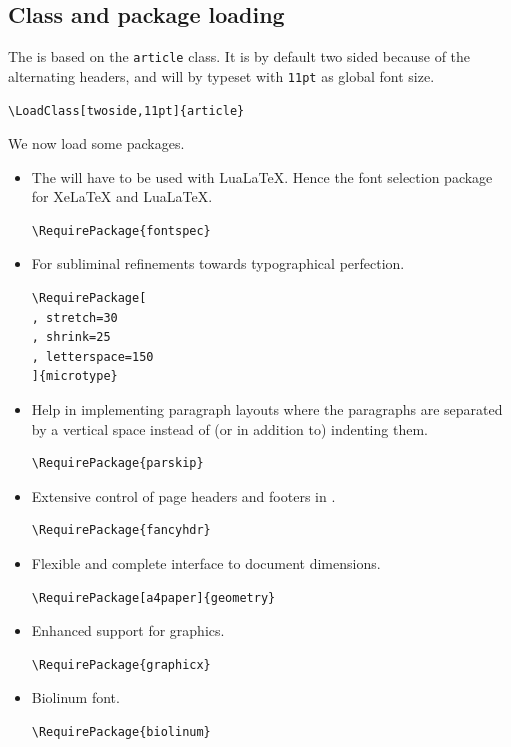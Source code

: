 \documentclass{letgut}
\begin{document}
\subsection{Class and package loading}
\label{sec:orgbefd239}

The  is based on the \lstinline+article+ class. It is by default two sided
because of the alternating headers, and will by typeset with \lstinline+11pt+ as global
font size.

\begin{lstlisting}
\LoadClass[twoside,11pt]{article}
\end{lstlisting}

We now load some packages.

\begin{itemize}
\item The  will have to be used with LuaLaTeX. Hence the font selection
package for XeLaTeX and LuaLaTeX.
\begin{lstlisting}
\RequirePackage{fontspec}
\end{lstlisting}
\item For subliminal refinements towards typographical perfection.
\begin{lstlisting}
\RequirePackage[
, stretch=30
, shrink=25
, letterspace=150
]{microtype}
\end{lstlisting}
\item Help in implementing paragraph layouts where the paragraphs are separated by
a vertical space instead of (or in addition to) indenting them.
\begin{lstlisting}
\RequirePackage{parskip}
\end{lstlisting}
\item Extensive control of page headers and footers in \LaTeXe.
\begin{lstlisting}
\RequirePackage{fancyhdr}
\end{lstlisting}
\item Flexible and complete interface to document dimensions.
\begin{lstlisting}
\RequirePackage[a4paper]{geometry}
\end{lstlisting}
\item Enhanced support for graphics.
\begin{lstlisting}
\RequirePackage{graphicx}
\end{lstlisting}
\item Biolinum font.
\begin{lstlisting}
\RequirePackage{biolinum}
\end{lstlisting}

\end{itemize}
\end{document}
